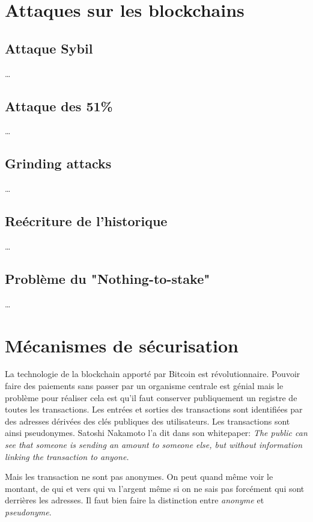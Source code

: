 \documentclass[../tb_report.tex]{subfiles}
\begin{document}
\section{Attaques sur les blockchains}

\subsection{Attaque Sybil}

\dots

\subsection{Attaque des 51\%}

\dots

\subsection{Grinding attacks}

\dots

\subsection{Reécriture de l'historique}

\dots

\subsection{Problème du "Nothing-to-stake"}

\dots

\section{Mécanismes de sécurisation}

La technologie de la blockchain apporté par Bitcoin est révolutionnaire. Pouvoir faire des paiements sans passer par un organisme centrale est génial mais le problème pour réaliser cela est qu'il faut conserver publiquement un registre de toutes les transactions. Les entrées et sorties des transactions sont identifiées par des adresses dérivées des clés publiques des utilisateurs. Les transactions sont ainsi pseudonymes. Satoshi Nakamoto l'a dit dans son whitepaper: \textit{The public can see that someone is sending an amount to someone else, but without information linking the transaction to anyone.}

Mais les transaction ne sont pas anonymes. On peut quand même voir le montant, de qui et vers qui va l'argent même si on ne sais pas forcément qui sont derrières les adresses. Il faut bien faire la distinction entre \emph{anonyme} et \emph{pseudonyme}.
\end{document}

